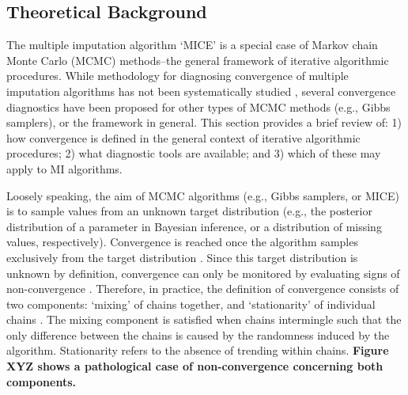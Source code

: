 \documentclass[article]{jss}
\begin{document}
% 
% 

\subsection{Theoretical Background} \label{sec:background}

The multiple imputation algorithm `MICE' is a special case of Markov chain Monte Carlo (MCMC) methods--the general framework of iterative algorithmic procedures. While methodology for diagnosing convergence of multiple imputation algorithms has not been systematically studied \citep{buur18}, several convergence diagnostics have been proposed for other types of MCMC methods (e.g., Gibbs samplers), or the framework in general.
This section provides a brief review of: 1) how convergence is defined in the general context of iterative algorithmic procedures; 2) what diagnostic tools are available; and 3) which of these may apply to MI algorithms. 

Loosely speaking, the aim of MCMC algorithms (e.g., Gibbs samplers, or MICE) is to sample values from an unknown target distribution (e.g., the posterior distribution of a parameter in Bayesian inference, or a distribution of missing values, respectively). Convergence is reached once the algorithm samples exclusively from the target distribution \citep{cowl96}. Since this target distribution is unknown by definition, convergence can only be monitored by evaluating signs of non-convergence \citep{hoff09}. Therefore, in practice, the definition of convergence consists of two components: `mixing' of chains together, and `stationarity' of individual chains \citep[p.~284]{gelm13}. The mixing component is satisfied when chains intermingle such that the only difference between the chains is caused by the randomness induced by the algorithm. Stationarity refers to the absence of trending within chains. \textbf{Figure XYZ shows a pathological case of non-convergence concerning both components.}  
\end{document}
